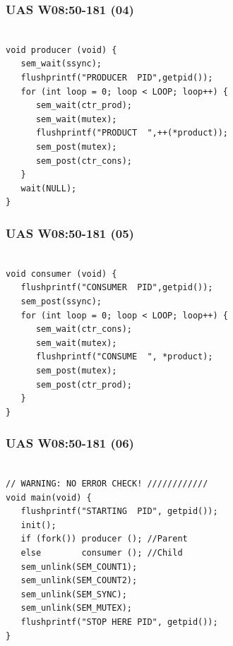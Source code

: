 \documentclass[aspectratio=169, xcolor=table, notheorems, hyperref={pdfpagelabels=false}]{beamer}
\begin{document}
\begin{frame}[fragile]
\frametitle{UAS W08:50-181 (04)}
\begin{lstlisting}[basicstyle=\ttfamily\large]        %  54

void producer (void) {
   sem_wait(ssync);
   flushprintf("PRODUCER  PID",getpid());
   for (int loop = 0; loop < LOOP; loop++) {
      sem_wait(ctr_prod);
      sem_wait(mutex);
      flushprintf("PRODUCT  ",++(*product));
      sem_post(mutex);
      sem_post(ctr_cons);
   }
   wait(NULL);
}

\end{lstlisting}
\end{frame}

\begin{frame}[fragile]
\frametitle{UAS W08:50-181 (05)}
\begin{lstlisting}[basicstyle=\ttfamily\large]        %  54

void consumer (void) {
   flushprintf("CONSUMER  PID",getpid());
   sem_post(ssync);
   for (int loop = 0; loop < LOOP; loop++) {
      sem_wait(ctr_cons);
      sem_wait(mutex);
      flushprintf("CONSUME  ", *product);
      sem_post(mutex);
      sem_post(ctr_prod);
   }
}

\end{lstlisting}
\end{frame}

\begin{frame}[fragile]
\frametitle{UAS W08:50-181 (06)}
\begin{lstlisting}[basicstyle=\ttfamily\large]        %  54

// WARNING: NO ERROR CHECK! ////////////
void main(void) {
   flushprintf("STARTING  PID", getpid());
   init();
   if (fork()) producer (); //Parent
   else        consumer (); //Child
   sem_unlink(SEM_COUNT1);
   sem_unlink(SEM_COUNT2);
   sem_unlink(SEM_SYNC);
   sem_unlink(SEM_MUTEX);
   flushprintf("STOP HERE PID", getpid());
}

\end{lstlisting}
\end{frame}
\end{document}
